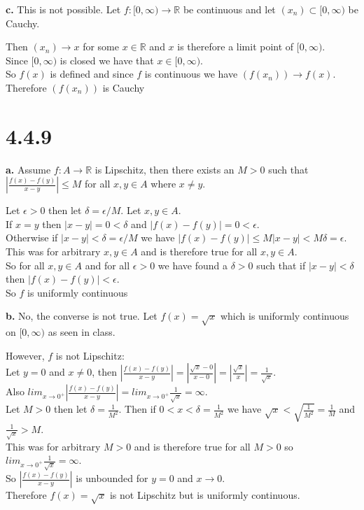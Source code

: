 \documentclass{article}
\begin{document}
{\Large\textbf{c.}} This is not possible. Let $f: [0,\infty )\rightarrow\mathbb{R}$ be continuous and let $(x_n)\subset [0,\infty )$ be Cauchy.
\begin{center}
    \doublespacing
    Then $(x_n)\rightarrow x$ for some $x\in\mathbb{R}$ and $x$ is therefore a limit point of $[0,\infty )$.
    \\Since $[0,\infty )$ is closed we have that $x\in [0,\infty )$.
    \\So $f(x)$ is defined and since $f$ is continuous we have $(f(x_n))\rightarrow f(x)$.
    \\Therefore $(f(x_n))$ is Cauchy \qedsymbol
\end{center}


\newpage
\section*{4.4.9}

{\Large\textbf{a.}} Assume $f: A\rightarrow\mathbb{R}$ is Lipschitz, then there exists an $M > 0$ such that $|\frac{f(x) - f(y)}{x - y}|\leq M$ for all $x, y\in A$ where $x\neq y$.
\begin{center}
    \doublespacing
    Let $\epsilon > 0$ then let $\delta =\epsilon / M$. Let $x, y\in A$.
    \\If $x = y$ then $|x - y| = 0 <\delta$ and $|f(x) - f(y)| = 0 <\epsilon$.
    \\Otherwise if $|x - y| <\delta =\epsilon / M$ we have $|f(x) - f(y)|\leq M|x - y| < M\delta =\epsilon$.
    \\This was for arbitrary $x, y\in A$ and is therefore true for all $x, y\in A$.
    \\So for all $x, y\in A$ and for all $\epsilon > 0$ we have found a $\delta > 0$ such that if $|x - y| <\delta$ then $|f(x) - f(y)| <\epsilon$.
    \\So $f$ is uniformly continuous \qedsymbol
\end{center}

{\Large\textbf{b.}} No, the converse is not true. Let $f(x) =\sqrt{x}$ which is uniformly continuous on $[0,\infty )$ as seen in class.
\begin{center}
    \doublespacing
    However, $f$ is not Lipschitz:
    \\Let $y = 0$ and $x\neq 0$, then $|\frac{f(x) - f(y)}{x - y}| = |\frac{\sqrt{x} - 0}{x - 0}| = |\frac{\sqrt{x}}{x}| =\frac{1}{\sqrt{x}}$.
    \\Also $lim _{x\rightarrow 0^+} |\frac{f(x) - f(y)}{x - y}| = lim _{x\rightarrow 0^+} \frac{1}{\sqrt{x}} =\infty$.
    \\Let $M > 0$ then let $\delta = \frac{1}{M^2}$. Then if $0 < x <\delta =\frac{1}{M^2}$ we have $\sqrt{x} <\sqrt{\frac{1}{M^2}} =\frac{1}{M}$ and $\frac{1}{\sqrt{x}} > M$.
    \\This was for arbitrary $M > 0$ and is therefore true for all $M > 0$ so $lim _{x\rightarrow 0^+}\frac{1}{\sqrt{x}} =\infty$.
    \\So $|\frac{f(x) - f(y)}{x - y}|$ is unbounded for $y = 0$ and $x\rightarrow 0$.
    \\Therefore $f(x) =\sqrt{x}$ is not Lipschitz but is uniformly continuous.
\end{center}
\end{document}
